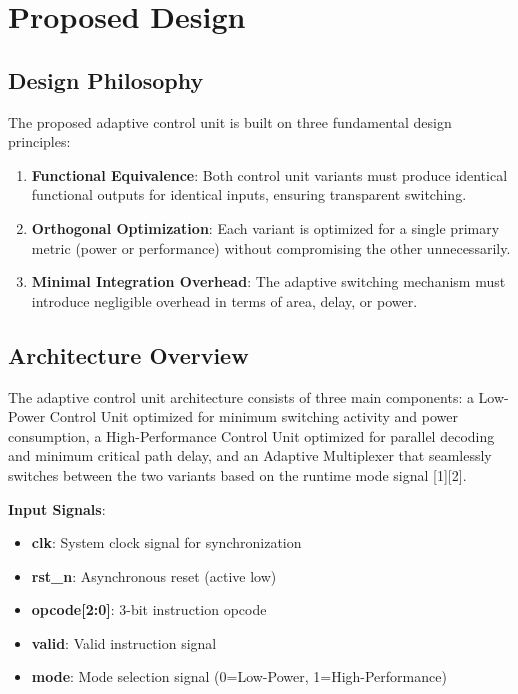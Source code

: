 \documentclass[15pt,a4paper]{report}
\begin{document}
\newpage

\chapter{Proposed Design}

\section{Design Philosophy}

The proposed adaptive control unit is built on three fundamental design principles:

\begin{enumerate}
    \item \textbf{Functional Equivalence}: Both control unit variants must produce identical functional outputs for identical inputs, ensuring transparent switching.
    
    \item \textbf{Orthogonal Optimization}: Each variant is optimized for a single primary metric (power or performance) without compromising the other unnecessarily.
    
    \item \textbf{Minimal Integration Overhead}: The adaptive switching mechanism must introduce negligible overhead in terms of area, delay, or power.
\end{enumerate}

\section{Architecture Overview}

The adaptive control unit architecture consists of three main components: a Low-Power Control Unit optimized for minimum switching activity and power consumption, a High-Performance Control Unit optimized for parallel decoding and minimum critical path delay, and an Adaptive Multiplexer that seamlessly switches between the two variants based on the runtime mode signal [1][2].

\textbf{Input Signals}:
\begin{itemize}
    \item \textbf{clk}: System clock signal for synchronization
    \item \textbf{rst\_n}: Asynchronous reset (active low)
    \item \textbf{opcode[2:0]}: 3-bit instruction opcode
    \item \textbf{valid}: Valid instruction signal
    \item \textbf{mode}: Mode selection signal (0=Low-Power, 1=High-Performance)
\end{itemize}
\end{document}
